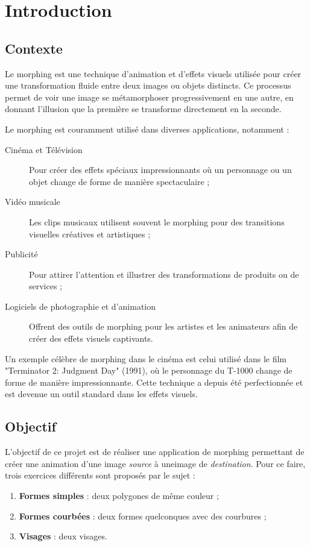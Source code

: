 \section{Introduction}

\subsection{Contexte}

Le morphing est une technique d'animation et d'effets visuels utilisée pour créer une transformation fluide entre deux images ou objets distincts. Ce processus permet de voir une image se métamorphoser progressivement en une autre, en donnant l'illusion que la première se transforme directement en la seconde.

Le morphing est couramment utilisé dans diverses applications, notamment :

\begin{description}
    \item[Cinéma et Télévision] Pour créer des effets spéciaux impressionnants où un personnage ou un objet change de forme de manière spectaculaire ;
    \item[Vidéo musicale] Les clips musicaux utilisent souvent le morphing pour des transitions visuelles créatives et artistiques ;
    \item[Publicité] Pour attirer l'attention et illustrer des transformations de produits ou de services ;
    \item[Logiciels de photographie et d'animation] Offrent des outils de morphing pour les artistes et les animateurs afin de créer des effets visuels captivants.
\end{description}

Un exemple célèbre de morphing dans le cinéma est celui utilisé dans le film "Terminator 2: Judgment Day" (1991), où le personnage du T-1000 change de forme de manière impressionnante. Cette technique a depuis été perfectionnée et est devenue un outil standard dans les effets visuels.


\subsection{Objectif}

L'objectif de ce projet est de réaliser une application de morphing permettant de créer une animation d'une image  \emph{source} à uneimage de  \emph{destination}. Pour ce faire, trois exercices différents sont proposés par le sujet :

\begin{enumerate}
    \item \textbf{Formes simples} : deux polygones de même couleur ;
    \item \textbf{Formes courbées} : deux formes quelconques avec des courbures ;
    \item \textbf{Visages} : deux visages.
\end{enumerate}

